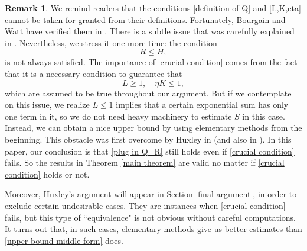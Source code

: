 \documentclass[11pt]{amsart}
\numberwithin{equation}{section}
\theoremstyle{definition}
\newtheorem{remark}[theorem]{Remark}
\theoremstyle{proposition}
\begin{document}
\begin{remark}  \label{issue}
We remind readers that the conditions \eqref{definition of Q} and \eqref{L,K,eta} cannot be taken for granted from their definitions. Fortunately, Bourgain and Watt have verified them in \cite[Section 6]{BourgainWatt2nd}. There is a subtle issue that was carefully explained in \cite[Section 6]{BourgainWatt2nd}. Nevertheless, we stress it one more time: the condition
\begin{equation}  \label{crucial condition}
R\le H,  
\end{equation}
is not always satisfied. The importance of \eqref{crucial condition} comes from the fact that it is a necessary condition to guarantee that
\[
L \ge 1, \quad \eta K \le 1, 
\]
which are assumed to be true throughout our argument. But if we contemplate on this issue, we realize $L\le 1$ implies that a certain exponential sum has only one term in it, so we do not need heavy machinery to estimate $S$ in this case. Instead, we can obtain a nice upper bound by using elementary methods from the beginning. This obstacle was first overcome by Huxley in \cite[Page 377]{Huxley1996}  (and also in \cite[(3.26), (3.27)]{Huxley03}). In this paper, our conclusion is that \eqref{plug in Q=R} still holds even if \eqref{crucial condition} fails. So the results in Theorem \ref{main theorem} are valid no matter if \eqref{crucial condition} holds or not.

Moreover, Huxley's argument will appear in Section \ref{final argument}, in order to exclude certain undesirable cases. They are instances when \eqref{crucial condition} fails, but this type of ``equivalence" is not obvious without careful computations. It turns out that, in such cases, elementary methods give us better estimates than \eqref{upper bound middle form} does.\\
\end{remark} 
\end{document}
